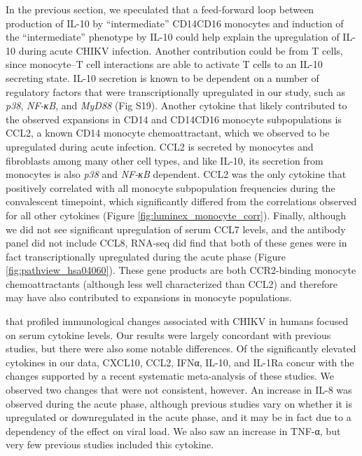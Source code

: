 In the previous section, we speculated that a feed-forward loop between production of IL-10 by “intermediate” CD14\sups{++}\allowbreak CD16\sups{+} monocytes\autocite{Skrzeczynska-Moncznik2008} and induction of the “intermediate” phenotype by IL-10\autocite{Tsukamoto2017} could help explain the upregulation of IL-10 during acute CHIKV infection. Another contribution could be from T cells, since monocyte–T cell interactions are able to activate T cells to an IL-10 secreting state.\autocite{Charron2015} IL-10 secretion is known to be dependent on a number of regulatory factors that were transcriptionally upregulated in our study, such as \emph{p38}, \emph{NF-κΒ}, and \emph{MyD88} (Fig S19).\autocite{Saraiva2010} Another cytokine that likely contributed to the observed expansions in CD14\sups{+} and CD14\sups{+}\allowbreak CD16\sups{+} monocyte subpopulations is CCL2, a known CD14\sups{+} monocyte chemoattractant,\autocite{Serbina2008} which we observed to be upregulated during acute infection. CCL2 is secreted by monocytes and fibroblasts among many other cell types,\autocite{VanDamme1994} and like IL-10, its secretion from monocytes is also \emph{p38} and \emph{NF-κB} dependent.\autocite{Fietta2002} CCL2 was the only cytokine that positively correlated with all monocyte subpopulation frequencies during the convalescent timepoint, which significantly differed from the correlations observed for all other cytokines (Figure \ref{fig:luminex_monocyte_corr}). Finally, although we did not see significant upregulation of serum CCL7 levels, and the antibody panel did not include CCL8, RNA-seq did find that both of these genes were in fact transcriptionally upregulated during the acute phase (Figure \ref{fig:pathview_hsa04060}). These gene products are both CCR2-binding monocyte chemoattractants (although less well characterized than CCL2) and therefore may have also contributed to expansions in monocyte populations.

 that profiled immunological changes associated with CHIKV in humans focused on serum cytokine levels.\autocite{Chaaitanya2011,Chow2011,Ng2009,Schilte2013,Teng2015} Our results were largely concordant with previous studies, but there were also some notable differences. Of the significantly elevated cytokines in our data, CXCL10, CCL2, IFNα, IL-10, and IL-1Ra concur with the changes supported by a recent systematic meta-analysis of these studies.\autocite{Teng2015} We observed two changes that were not consistent, however. An increase in IL-8 was observed during the acute phase, although previous studies vary on whether it is upregulated or downregulated in the acute phase, and it may be in fact due to a dependency of the effect on viral load.\autocite{Teng2015} We also saw an increase in TNF-α, but very few previous studies included this cytokine.

